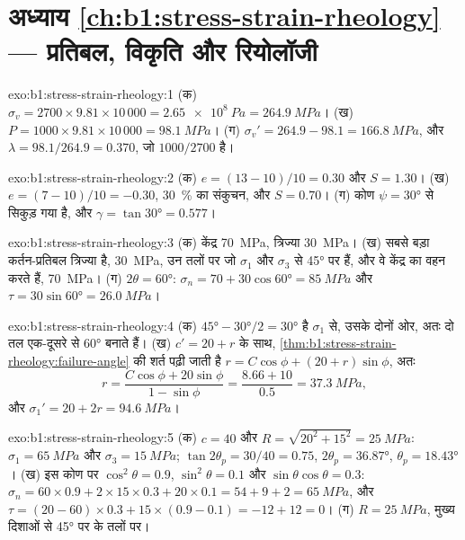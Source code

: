 \section*{अध्याय \ref{ch:b1:stress-strain-rheology} --- प्रतिबल, विकृति और रियोलॉजी}

\begin{solution}{exo:b1:stress-strain-rheology:1}
(क) $\sigma_v = 2700\times9.81\times10\,000 = \qty{2.65e8}{Pa} = \qty{264.9}{MPa}$।
(ख) $P = 1000\times9.81\times10\,000 = \qty{98.1}{MPa}$। (ग) $\sigma_v' =
264.9 - 98.1 = \qty{166.8}{MPa}$, और $\lambda = 98.1/264.9 = 0.370$, जो
$1000/2700$ है।
\end{solution}

\begin{solution}{exo:b1:stress-strain-rheology:2}
(क) $e = (13-10)/10 = 0.30$ और $S = 1.30$। (ख) $e = (7-10)/10 = -0.30$, \qty{30}{\percent} का संकुचन, और $S = 0.70$। (ग) कोण $\psi = \ang{30}$ से सिकुड़ गया है, और $\gamma = \tan\ang{30} = 0.577$।
\end{solution}

\begin{solution}{exo:b1:stress-strain-rheology:3}
(क) केंद्र \qty{70}{MPa}, त्रिज्या \qty{30}{MPa}। (ख) सबसे बड़ा कर्तन-प्रतिबल त्रिज्या है, \qty{30}{MPa}, उन तलों पर जो $\sigma_1$ और $\sigma_3$ से \ang{45} पर हैं, और वे केंद्र का  वहन करते हैं, \qty{70}{MPa}। (ग)
$2\theta = \ang{60}$: $\sigma_n = 70 + 30\cos\ang{60} = \qty{85}{MPa}$ और
$\tau = 30\sin\ang{60} = \qty{26.0}{MPa}$।
\end{solution}

\begin{solution}{exo:b1:stress-strain-rheology:4}
(क) $\ang{45} - \ang{30}/2 = \ang{30}$ है $\sigma_1$ से, उसके दोनों ओर, अतः दो तल एक-दूसरे से \ang{60} बनाते हैं। (ख) $c' = 20 + r$ के साथ, \cref{thm:b1:stress-strain-rheology:failure-angle} की शर्त पढ़ी जाती है
$r = C\cos\phi + (20 + r)\sin\phi$, अतः
\[
  r = \frac{C\cos\phi + 20\sin\phi}{1 - \sin\phi} = \frac{8.66 + 10}{0.5}
    = \qty{37.3}{MPa},
\]
और $\sigma_1' = 20 + 2r = \qty{94.6}{MPa}$।
\end{solution}

\begin{solution}{exo:b1:stress-strain-rheology:5}
(क) $c = 40$ और $R = \sqrt{20^2 + 15^2} = \qty{25}{MPa}$: $\sigma_1 =
\qty{65}{MPa}$ और $\sigma_3 = \qty{15}{MPa}$; $\tan2\theta_p = 30/40 = 0.75$,
$2\theta_p = \ang{36.87}$, $\theta_p = \ang{18.43}$। (ख) इस कोण पर
$\cos^2\theta = 0.9$, $\sin^2\theta = 0.1$ और $\sin\theta\cos\theta = 0.3$:
$\sigma_n = 60\times0.9 + 2\times15\times0.3 + 20\times0.1 = 54 + 9 + 2 =
\qty{65}{MPa}$, और $\tau = (20-60)\times0.3 + 15\times(0.9-0.1) = -12 + 12 =
0$। (ग) $R = \qty{25}{MPa}$, मुख्य दिशाओं से \ang{45} पर के तलों पर।
\end{solution}

